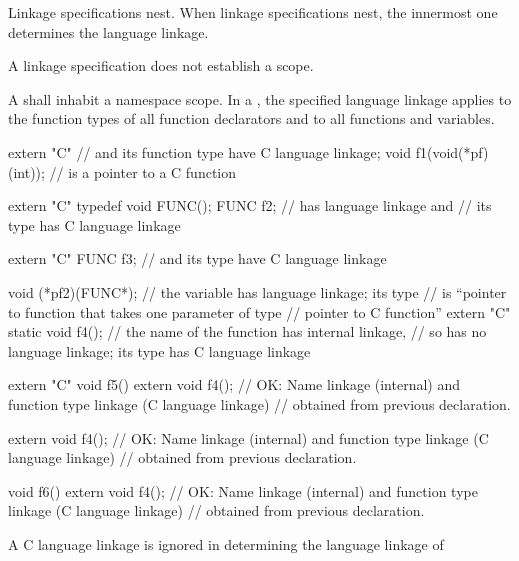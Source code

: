 \pnum
{}%
Linkage specifications nest. When linkage specifications nest, the
innermost one determines the language linkage.
\begin{note}
A linkage specification does not establish a scope.
\end{note}
A  shall inhabit a namespace scope.
In a ,
the specified language linkage applies
to the function types of all function declarators and
to all functions and variables.
\begin{example}
\begin{codeblock}
extern "C"                      //  and its function type have C language linkage;
  void f1(void(*pf)(int));      //  is a pointer to a C function

extern "C" typedef void FUNC();
FUNC f2;                        //  has \Cpp{} language linkage and
                                // its  type has C language linkage

extern "C" FUNC f3;             //  and its type have C language linkage

void (*pf2)(FUNC*);             // the variable  has \Cpp{} language linkage; its type
                                // is ``pointer to \Cpp{} function that takes one parameter of type
                                // pointer to C function''
extern "C" {
  static void f4();             // the name of the function  has internal linkage,
                                // so  has no language linkage; its type has C language linkage
}

extern "C" void f5() {
  extern void f4();             // OK: Name linkage (internal) and function type linkage (C language linkage)
                                // obtained from previous declaration.
}

extern void f4();               // OK: Name linkage (internal) and function type linkage (C language linkage)
                                // obtained from previous declaration.

void f6() {
  extern void f4();             // OK: Name linkage (internal) and function type linkage (C language linkage)
                                // obtained from previous declaration.
}
\end{codeblock}
\end{example}
%
A C language linkage is ignored
in determining the language linkage of
